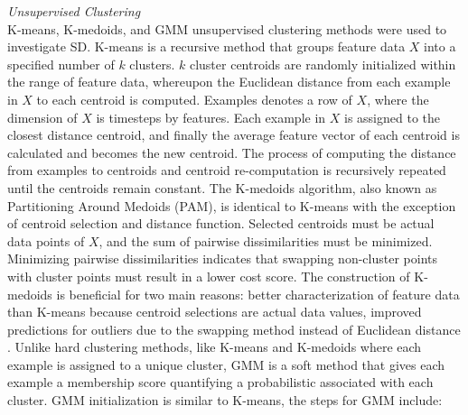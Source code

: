 \documentclass{ieeeaccess}
\begin{document}
\noindent \emph{Unsupervised Clustering}\\
K-means, K-medoids, and GMM unsupervised clustering methods were used to investigate SD. K-means is a recursive method that groups feature data $X$ into a specified number of $k$ clusters. $k$ cluster centroids are randomly initialized within the range of feature data, whereupon the Euclidean distance from each example in $X$ to each centroid is computed. Examples denotes a row of $X$, where the dimension of $X$ is timesteps by features. Each example in $X$ is assigned to the closest distance centroid, and finally the average feature vector of each centroid is calculated and becomes the new centroid. The process of computing the distance from examples to centroids and centroid re-computation is recursively repeated until the centroids remain constant. The K-medoids algorithm, also known as Partitioning Around Medoids (PAM), is identical to K-means with the exception of centroid selection and distance function. Selected centroids must be actual data points of $X$, and the sum of pairwise dissimilarities must be minimized. Minimizing pairwise dissimilarities indicates that swapping non-cluster points with cluster points must result in a lower cost score. The construction of K-medoids is beneficial for two main reasons: better characterization of feature data than K-means because centroid selections are actual data values, improved predictions for outliers due to the swapping method instead of Euclidean distance \cite{Kaufman_1990_PAM}. Unlike hard clustering methods, like K-means and K-medoids where each example is assigned to a unique cluster, GMM is a soft method that gives each example a membership score quantifying a probabilistic associated with each cluster. GMM initialization is similar to K-means, the steps for GMM include:
\end{document}
